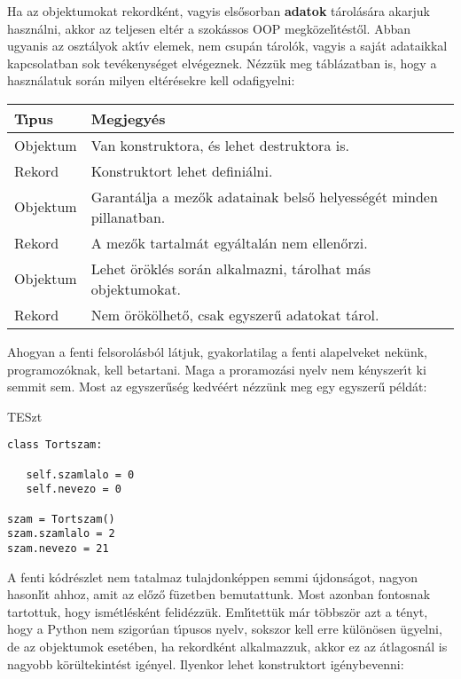 Ha az objektumokat rekordk\'ent, vagyis els\H{o}sorban {\bf adatok} t\'arol\'as\'ara akarjuk 
haszn\'alni, akkor az teljesen elt\'er a szok\'assos OOP  megk\"ozel\'{\i}t\'est\H{o}l. 
Abban ugyanis az oszt\'alyok akt\'{\i}v elemek, nem csup\'an t\'arol\'ok, vagyis a saj\'at 
adataikkal kapcsolatban sok tev\'ekenys\'eget elv\'egeznek. N\'ezz\"uk meg t\'abl\'azatban is, hogy a 
haszn\'alatuk sor\'an milyen elt\'er\'esekre kell odafigyelni:

\begin{center}
    \begin{tabular}{ | l | p{9cm} |}
    \hline
    {\bf T\'{\i}pus} & {\bf Megjegy\'es} \\ \hline
      Objektum & Van konstruktora, \'es lehet destruktora is.\\ \hline
      Rekord & Konstruktort lehet defini\'alni. \\ \hline
      Objektum & Garant\'alja a mez\H{o}k adatainak bels\H{o} helyess\'eg\'et minden pillanatban.\\ \hline
      Rekord & A mez\H{o}k tartalm\'at egy\'altal\'an nem ellen\H{o}rzi. \\ \hline
      Objektum & Lehet \"or\"okl\'es sor\'an alkalmazni, t\'arolhat m\'as objektumokat.\\ \hline
      Rekord &  Nem \"or\"ok\"olhet\H{o}, csak egyszer\H{u} adatokat t\'arol. \\ \hline    
    \end{tabular}
\end{center}

\noindent Ahogyan a fenti felsorol\'asb\'ol l\'atjuk, gyakorlatilag a fenti alapelveket nek\"unk, 
programoz\'oknak, kell betartani. Maga a proramoz\'asi nyelv nem k\'enyszer\'{\i}t ki semmit sem. Most 
az egyszer\H{u}s\'eg kedv\'e\'ert n\'ezz\"unk meg egy egyszer\H{u} p\'eld\'at:

TESzt

\begin{Verbatim}[fontsize=\small]
class Tortszam:

   self.szamlalo = 0
   self.nevezo = 0

szam = Tortszam()
szam.szamlalo = 2
szam.nevezo = 21
\end{Verbatim}

\noindent A fenti k\'odr\'eszlet nem tatalmaz tulajdonk\'eppen semmi \'ujdons\'agot, nagyon 
hasonl\'{\i}t ahhoz, amit az el\H{o}z\H{o} f\"uzetben bemutattunk. Most azonban fontosnak 
tartottuk, hogy ism\'etl\'esk\'ent felid\'ezz\"uk. Eml\'{\i}tett\"uk m\'ar t\"obbsz\"or 
azt a t\'enyt, hogy a Python nem szigor\'uan t\'{\i}pusos nyelv, sokszor kell erre 
k\"ul\"on\"osen \"ugyelni, de az objektumok eset\'eben, ha rekordk\'ent alkalmazzuk, akkor 
ez az \'atlagosn\'al is nagyobb k\"or\"ultekint\'est ig\'enyel. Ilyenkor lehet konstruktort 
ig\'enybevenni:

